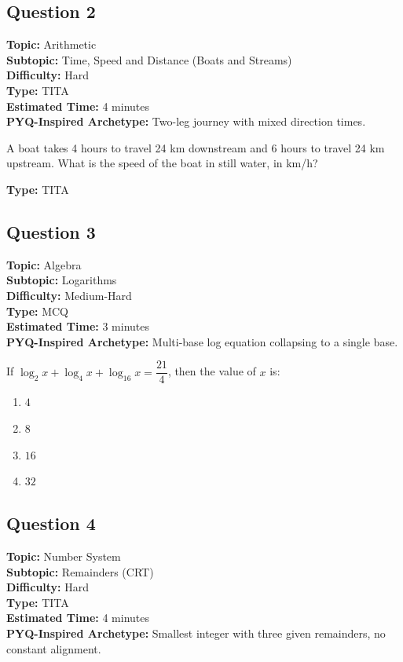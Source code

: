 \documentclass[11pt]{article}
\begin{document}
\subsection*{Question 2}
\textbf{Topic:} Arithmetic \\
\textbf{Subtopic:} Time, Speed and Distance (Boats and Streams) \\
\textbf{Difficulty:} Hard \\
\textbf{Type:} TITA \\
\textbf{Estimated Time:} 4 minutes \\
\textbf{PYQ-Inspired Archetype:} Two-leg journey with mixed direction times.

\begin{tcolorbox}
A boat takes 4 hours to travel 24 km downstream and 6 hours to travel 24 km upstream. What is the speed of the boat in still water, in km/h?
\end{tcolorbox}
\textbf{Type:} TITA

\subsection*{Question 3}
\textbf{Topic:} Algebra \\
\textbf{Subtopic:} Logarithms \\
\textbf{Difficulty:} Medium-Hard \\
\textbf{Type:} MCQ \\
\textbf{Estimated Time:} 3 minutes \\
\textbf{PYQ-Inspired Archetype:} Multi-base log equation collapsing to a single base.

\begin{tcolorbox}
If \(\log_2 x + \log_4 x + \log_{16} x = \dfrac{21}{4}\), then the value of \(x\) is:
\end{tcolorbox}
\begin{enumerate}[label=(\Alph*)]
\item \(4\)
\item \(8\)
\item \(16\)
\item \(32\)
\end{enumerate}

\subsection*{Question 4}
\textbf{Topic:} Number System \\
\textbf{Subtopic:} Remainders (CRT) \\
\textbf{Difficulty:} Hard \\
\textbf{Type:} TITA \\
\textbf{Estimated Time:} 4 minutes \\
\textbf{PYQ-Inspired Archetype:} Smallest integer with three given remainders, no constant alignment.
\end{document}

